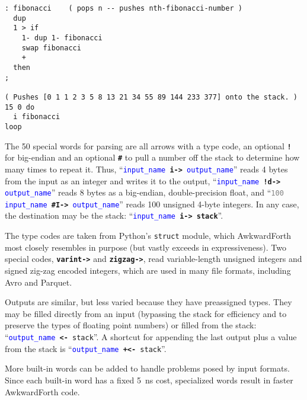 \documentclass{webofc}
\begin{document}
\begin{verbatim}
: fibonacci    ( pops n -- pushes nth-fibonacci-number )
  dup
  1 > if
    1- dup 1- fibonacci
    swap fibonacci
    +
  then
;

( Pushes [0 1 1 2 3 5 8 13 21 34 55 89 144 233 377] onto the stack. )
15 0 do
  i fibonacci
loop
\end{verbatim}

The 50 special words for parsing are all arrows with a type code, an optional \textcolor{OliveGreen}{\tt\textbf{!}} for big-endian and an optional \textcolor{OliveGreen}{\tt\textbf{\#}} to pull a number off the stack to determine how many times to repeat it. Thus, ``{\tt \textcolor{blue}{input\_name} \textcolor{OliveGreen}{\textbf{i->}} \textcolor{blue}{output\_name}}'' reads 4 bytes from the input as an integer and writes it to the output, ``{\tt \textcolor{blue}{input\_name} \textcolor{OliveGreen}{\textbf{!d->}} \textcolor{blue}{output\_name}}'' reads 8 bytes as a big-endian, double-precision float, and ``{\tt \textcolor{gray}{100} \textcolor{blue}{input\_name} \textcolor{OliveGreen}{\textbf{\#I->}} \textcolor{blue}{output\_name}}'' reads 100 unsigned 4-byte integers. In any case, the destination may be the stack: ``{\tt \textcolor{blue}{input\_name} \textcolor{OliveGreen}{\textbf{i->}} \textcolor{OliveGreen}{\textbf{stack}}}''.

The type codes are taken from Python's \texttt{struct} module, which AwkwardForth most closely resembles in purpose (but vastly exceeds in expressiveness). Two special codes, \textcolor{OliveGreen}{\tt\textbf{varint->}} and \textcolor{OliveGreen}{\tt\textbf{zigzag->}}, read variable-length unsigned integers and signed zig-zag encoded integers, which are used in many file formats, including Avro and Parquet.

Outputs are similar, but less varied because they have preassigned types. They may be filled directly from an input (bypassing the stack for efficiency and to preserve the types of floating point numbers) or filled from the stack: ``{\tt \textcolor{blue}{output\_name} \textcolor{OliveGreen}{\textbf{<-}} \textcolor{OliveGreen}{stack}}''. A shortcut for appending the last output plus a value from the stack is ``{\tt \textcolor{blue}{output\_name} \textcolor{OliveGreen}{\textbf{+<-}} \textcolor{OliveGreen}{stack}}''.

More built-in words can be added to handle problems posed by input formats. Since each built-in word has a fixed 5~ns cost, specialized words result in faster AwkwardForth code.
\end{document}
